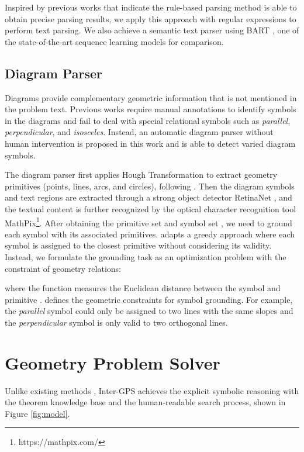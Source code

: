 \documentclass[11pt,a4paper]{article}
\begin{document}
Inspired by previous works \citep{koo2008simple,seo2015solving,bansal2014tailoring}   that indicate the rule-based parsing method is able to obtain precise parsing results, we apply this approach with regular expressions to perform text parsing.  We also achieve a semantic text parser using BART \cite{lewis2020bart}, one of the state-of-the-art sequence learning models for comparison. 






\subsection{Diagram Parser} \label{sec:diagram_parser}
Diagrams provide complementary geometric information that is not mentioned in the problem text. Previous works \citep{seo2014diagram,seo2015solving} require manual annotations to identify symbols in the diagrams and fail to deal with special relational symbols such as \textit{parallel}, \textit{perpendicular}, and \textit{isosceles}. Instead, an automatic diagram parser without human intervention is proposed in this work and is able to detect varied diagram symbols.

The diagram parser first applies Hough Transformation \citep{shapiro2001computer} to extract geometry primitives (points, lines, arcs, and circles), following \citep{seo2015solving}. Then the diagram symbols and text regions are extracted through a strong object detector RetinaNet \cite{lin2017focal}, and the textual content is further recognized by the optical character recognition tool MathPix\footnote{https://mathpix.com/}.  After obtaining the primitive set  and symbol set , we need to ground each symbol with its associated primitives. \cite{seo2015solving} adapts a greedy approach where each symbol is assigned to the closest primitive without considering its validity. Instead, we formulate the grounding task as an optimization problem with the constraint of geometry relations:


where the  function measures the Euclidean distance between the symbol  and primitive .  defines the geometric constraints for symbol grounding. For example, the \textit{parallel} symbol could only be assigned to two lines with the same slopes and the \textit{perpendicular} symbol is only valid to two orthogonal lines.





\section{Geometry Problem Solver}
Unlike existing methods \cite{seo2015solving,sachan2017textbooks,alvin2017synthesis,sachan2020discourse}, Inter-GPS achieves the explicit symbolic reasoning with the theorem knowledge base and the human-readable search process, shown in Figure \ref{fig:model}.
\end{document}
